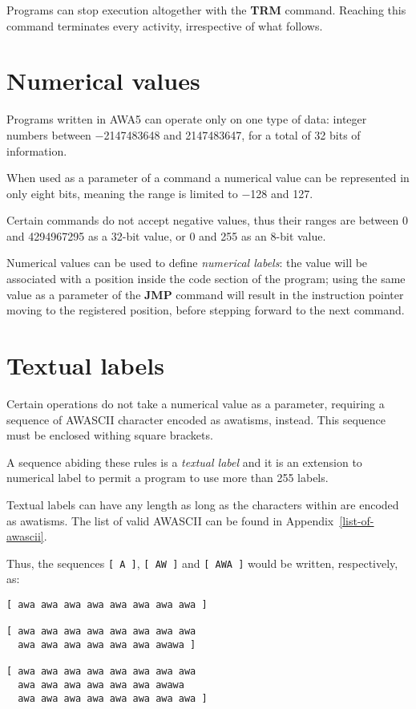 \documentclass[11pt,a4paper,draft]{book}
\begin{document}
Programs can stop execution altogether with the \textbf{TRM}
command. Reaching this command terminates every activity, irrespective
of what follows.

\section{Numerical values}
Programs written in AWA5 can operate only on one type of data: integer
numbers between \num{-2147483648} and \num{2147483647}, for a total of
\num{32} bits of information.

When used as a parameter of a command a numerical value can be
represented in only eight bits, meaning the range is limited to
\num{-128} and \num{127}.

Certain commands do not accept negative values, thus their ranges are
between \num{0} and \num{4294967295} as a \num{32}-bit value, or
\num{0} and \num{255} as an \num{8}-bit value.

Numerical values can be used to define \emph{numerical labels}: the
value will be associated with a position inside the code section of
the program; using the same value as a parameter of the \textbf{JMP}
command will result in the instruction pointer moving to the
registered position, before stepping forward to the next command.

\section{Textual labels}
Certain operations do not take a numerical value as a parameter,
requiring a sequence of AWASCII character encoded as awatisms,
instead. This sequence must be enclosed withing square brackets.

A sequence abiding these rules is a \emph{textual label} and it is an
extension to numerical label to permit a program to use more than
\num{255} labels.

Textual labels can have any length as long as the characters within
are encoded as awatisms. The list of valid AWASCII can be found in
Appendix~\ref{list-of-awascii}.

Thus, the sequences \verb|[ A ]|, \verb|[ AW ]| and \verb|[ AWA ]|
would be written, respectively, as:
\begin{verbatim}
[ awa awa awa awa awa awa awa awa ]

[ awa awa awa awa awa awa awa awa
  awa awa awa awa awa awa awawa ]

[ awa awa awa awa awa awa awa awa
  awa awa awa awa awa awa awawa
  awa awa awa awa awa awa awa awa ]
\end{verbatim}
\end{document}
